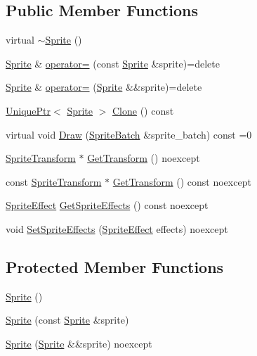 \subsection*{Public Member Functions}
\begin{DoxyCompactItemize}
\item 
virtual \hyperlink{classmage_1_1_sprite_a0f184574f9c035d6fbb239c1868aa670}{$\sim$\+Sprite} ()
\item 
\hyperlink{classmage_1_1_sprite}{Sprite} \& \hyperlink{classmage_1_1_sprite_aa24dfc716d8b79cc16b4c27409f8cc6b}{operator=} (const \hyperlink{classmage_1_1_sprite}{Sprite} \&sprite)=delete
\item 
\hyperlink{classmage_1_1_sprite}{Sprite} \& \hyperlink{classmage_1_1_sprite_a808d87aeb6d652f9a53e967a75a1eede}{operator=} (\hyperlink{classmage_1_1_sprite}{Sprite} \&\&sprite)=delete
\item 
\hyperlink{namespacemage_a3316d7143a973e37adf1110f2e80ca31}{Unique\+Ptr}$<$ \hyperlink{classmage_1_1_sprite}{Sprite} $>$ \hyperlink{classmage_1_1_sprite_a66e27a8a98ac5a4289e8440ef8193718}{Clone} () const
\item 
virtual void \hyperlink{classmage_1_1_sprite_a954a9f2046edcd6b1658a236ae23ec5a}{Draw} (\hyperlink{classmage_1_1_sprite_batch}{Sprite\+Batch} \&sprite\+\_\+batch) const =0
\item 
\hyperlink{classmage_1_1_sprite_transform}{Sprite\+Transform} $\ast$ \hyperlink{classmage_1_1_sprite_aa28e031e38c51619b3bd7853d212ae06}{Get\+Transform} () noexcept
\item 
const \hyperlink{classmage_1_1_sprite_transform}{Sprite\+Transform} $\ast$ \hyperlink{classmage_1_1_sprite_a8e2c0ae634492efacc92aab2e18e701c}{Get\+Transform} () const noexcept
\item 
\hyperlink{namespacemage_a9cfe18123066ba4236f548f9de75d881}{Sprite\+Effect} \hyperlink{classmage_1_1_sprite_a1a969b7cf3f1892894710a80582b4cd2}{Get\+Sprite\+Effects} () const noexcept
\item 
void \hyperlink{classmage_1_1_sprite_abeefc8ed41e55924be83ba7b480aa40e}{Set\+Sprite\+Effects} (\hyperlink{namespacemage_a9cfe18123066ba4236f548f9de75d881}{Sprite\+Effect} effects) noexcept
\end{DoxyCompactItemize}
\subsection*{Protected Member Functions}
\begin{DoxyCompactItemize}
\item 
\hyperlink{classmage_1_1_sprite_af04ff53dcfcc4aa5001368882c911cf7}{Sprite} ()
\item 
\hyperlink{classmage_1_1_sprite_a9c1eb4f5a85e1fa17479012dd22114a9}{Sprite} (const \hyperlink{classmage_1_1_sprite}{Sprite} \&sprite)
\item 
\hyperlink{classmage_1_1_sprite_a99bc5627bf389bb43e4b84375bc22fdc}{Sprite} (\hyperlink{classmage_1_1_sprite}{Sprite} \&\&sprite) noexcept
\end{DoxyCompactItemize}
